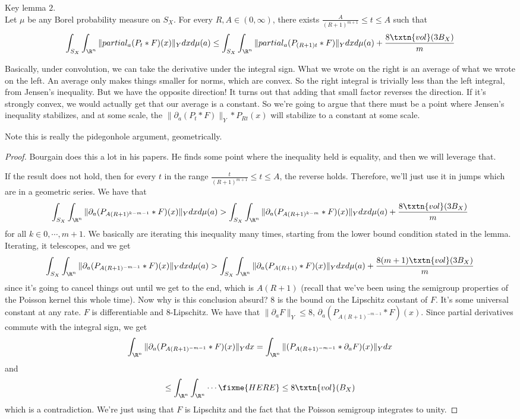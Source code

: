 \begin{lem} Key lemma $2$. \\
Let $\mu$ be any Borel probability measure on $S_X$. For every $R, A \in (0, \infty)$, there exists $ \frac{A}{(R + 1)^{m + 1}} \leq t \leq A$ such that 
\[
\int_{S_X} \int_{\R^n} \|partial_a (P_t * F)(x)\|_Y dx d\mu(a) \leq \int_{S_X} \int_{\R^n} \|partial_a(P_{(R + 1)t} * F)\|_Y dx d\mu(a) + \frac{8\txtn{vol}(3B_X)}{m}
\]
\end{lem}
Basically, under convolution, we can take the derivative under the integral sign. What we wrote on the right is an average of what we wrote on the left. An average only makes things smaller for norms, which are convex. So the right integral is trivially less than the left integral, from Jensen's inequality. But we have the opposite direction! It turns out that adding that small factor reverses the direction. If it's strongly convex, we would actually get that our average is a constant. So we're going to argue that there must be a point where Jensen's inequality stabilizes, and at some scale, the $\|\partial_a(P_t*F)\|_Y*P_{Rt}(x)$ will stabilize to a constant at some scale. 

Note this is really the pidegonhole argument, geometrically.

\begin{proof}
Bourgain does this a lot in his papers. He finds some point where the inequality held is equality, and then we will leverage that. 

If the result does not hold, then for every $t$ in the range $\frac{t}{(R + 1)^{m + 1}} \leq t \leq A$, the reverse holds. Therefore, we'll just use it in jumps which are in a geometric series. We have that 
\[
\int_{S_X} \int_{\R^n} \|\partial_a(P_{A(R + 1)^{k - m - 1}}*F)(x)\|_Ydxd\mu(a) > \int_{S_X} \int_{\R^n} \|\partial_a(P_{A(R + 1)^{k - m}}*F)(x)\|_Y dxd\mu(a) + \frac{8\txtn{vol}(3B_X)}{m}
\]
for all $k \in 0, \cdots, m + 1$. We basically are iterating this inequality many times, starting from the lower bound condition stated in the lemma. Iterating, it telescopes, and we get 
\[
\int_{S_X} \int_{\R^n} \|\partial_a(P_{A(R + 1)^{-m - 1}}*F)(x)\|_Y dxd\mu(a) > \int_{S_X} \int_{\R^n} \|\partial_a(P_{A(R + 1)}*F)(x)\|_Y dxd\mu(a) + \frac{8(m + 1)\txtn{vol}(3B_X)}{m}
\]
since it's going to cancel things out until we get to the end, which is $A(R + 1)$ (recall that we've been using the semigroup properties of the Poisson kernel this whole time). Now why is this conclusion absurd? $8$ is the bound on the Lipschitz constant of $F$. It's some universal constant at any rate. $F$ is differentiable and $8$-Lipschitz. We have that $\|\partial_aF\|_Y \leq 8$, $\partial_a(P_{A(R+1)^{-m - 1}}*F)(x)$. Since partial derivatives commute with the integral sign, we get 
\[
\int_{\R^n} \|\partial_a(P_{A(R+1)^{-m - 1}}*F)(x)\|_Y dx = \int_{\R^n} \|(P_{A(R+1)^{-m - 1}}*\partial_aF)(x)\|_Y dx
\]
and 
\[
\leq \int_{\R^n} \int_{\R^n} \cdots \fixme{HERE} \leq 8\txtn{vol}(B_X)
\]
which is a contradiction.
We're just using that $F$ is Lipschitz and the fact that the Poisson semigroup integrates to unity. 
\end{proof}

